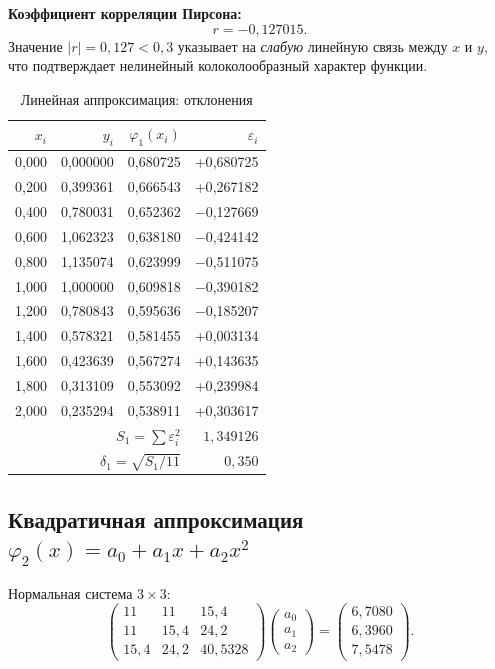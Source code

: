\documentclass[12pt,a4paper]{article}
\begin{document}
\textbf{Коэффициент корреляции Пирсона:}
\[
  r = -0{,}127015.
\]
Значение $|r| = 0{,}127 < 0{,}3$ указывает на \emph{слабую} линейную связь
между $x$ и $y$, что подтверждает нелинейный колоколообразный характер функции.

\begin{table}[H]
\centering
\caption{Линейная аппроксимация: отклонения}
\begin{tabular}{r|r|r|r}
\toprule
$x_i$ & $y_i$ & $\varphi_1(x_i)$ & $\varepsilon_i$ \\
\midrule
0{,}000 & 0{,}000000 & 0{,}680725 & +0{,}680725 \\
0{,}200 & 0{,}399361 & 0{,}666543 & +0{,}267182 \\
0{,}400 & 0{,}780031 & 0{,}652362 & $-$0{,}127669 \\
0{,}600 & 1{,}062323 & 0{,}638180 & $-$0{,}424142 \\
0{,}800 & 1{,}135074 & 0{,}623999 & $-$0{,}511075 \\
1{,}000 & 1{,}000000 & 0{,}609818 & $-$0{,}390182 \\
1{,}200 & 0{,}780843 & 0{,}595636 & $-$0{,}185207 \\
1{,}400 & 0{,}578321 & 0{,}581455 & +0{,}003134 \\
1{,}600 & 0{,}423639 & 0{,}567274 & +0{,}143635 \\
1{,}800 & 0{,}313109 & 0{,}553092 & +0{,}239984 \\
2{,}000 & 0{,}235294 & 0{,}538911 & +0{,}303617 \\
\midrule
\multicolumn{3}{r|}{$S_1 = \sum\varepsilon_i^2$} & $1{,}349126$ \\
\multicolumn{3}{r|}{$\delta_1 = \sqrt{S_1/11}$} & $0{,}350$ \\
\bottomrule
\end{tabular}
\end{table}

\subsection{Квадратичная аппроксимация \texorpdfstring{$\varphi_2(x) = a_0+a_1x+a_2x^2$}{}}

Нормальная система $3\times3$:
\[
  \begin{pmatrix}
    11 & 11 & 15{,}4 \\
    11 & 15{,}4 & 24{,}2 \\
    15{,}4 & 24{,}2 & 40{,}5328
  \end{pmatrix}
  \begin{pmatrix} a_0 \\ a_1 \\ a_2 \end{pmatrix}
  =
  \begin{pmatrix} 6{,}7080 \\ 6{,}3960 \\ 7{,}5478 \end{pmatrix}.
\]
\end{document}
